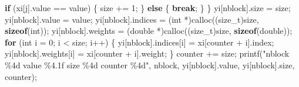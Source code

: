 \documentclass[
  12pt,
  letterpaper,
  DIV=11,
  numbers=noendperiod]{scrreprt}
\newenvironment{Shaded}{\begin{snugshade}}{\end{snugshade}}
\newcommand{\ControlFlowTok}[1]{\textcolor[rgb]{0.00,0.23,0.31}{\textbf{#1}}}
\newcommand{\DataTypeTok}[1]{\textcolor[rgb]{0.68,0.00,0.00}{#1}}
\newcommand{\DecValTok}[1]{\textcolor[rgb]{0.68,0.00,0.00}{#1}}
\newcommand{\KeywordTok}[1]{\textcolor[rgb]{0.00,0.23,0.31}{\textbf{#1}}}
\newcommand{\NormalTok}[1]{\textcolor[rgb]{0.00,0.23,0.31}{#1}}
\newcommand{\OperatorTok}[1]{\textcolor[rgb]{0.37,0.37,0.37}{#1}}
\newcommand{\SpecialCharTok}[1]{\textcolor[rgb]{0.37,0.37,0.37}{#1}}
\newcommand{\StringTok}[1]{\textcolor[rgb]{0.13,0.47,0.30}{#1}}
\theoremstyle{remark}
\begin{document}
\begin{Shaded}
\begin{Highlighting}[]
            \ControlFlowTok{if} \OperatorTok{(}\NormalTok{xi}\OperatorTok{[}\NormalTok{j}\OperatorTok{].}\NormalTok{value }\OperatorTok{==}\NormalTok{ value}\OperatorTok{)} \OperatorTok{\{}
\NormalTok{                size }\OperatorTok{+=} \DecValTok{1}\OperatorTok{;}
            \OperatorTok{\}} \ControlFlowTok{else} \OperatorTok{\{}
                \ControlFlowTok{break}\OperatorTok{;}
            \OperatorTok{\}}
        \OperatorTok{\}}
\NormalTok{        yi}\OperatorTok{[}\NormalTok{nblock}\OperatorTok{].}\NormalTok{size }\OperatorTok{=}\NormalTok{ size}\OperatorTok{;}
\NormalTok{        yi}\OperatorTok{[}\NormalTok{nblock}\OperatorTok{].}\NormalTok{value }\OperatorTok{=}\NormalTok{ value}\OperatorTok{;}
\NormalTok{        yi}\OperatorTok{[}\NormalTok{nblock}\OperatorTok{].}\NormalTok{indices }\OperatorTok{=} \OperatorTok{(}\DataTypeTok{int} \OperatorTok{*)}\NormalTok{calloc}\OperatorTok{((}\DataTypeTok{size\_t}\OperatorTok{)}\NormalTok{size}\OperatorTok{,} \KeywordTok{sizeof}\OperatorTok{(}\DataTypeTok{int}\OperatorTok{));}
\NormalTok{        yi}\OperatorTok{[}\NormalTok{nblock}\OperatorTok{].}\NormalTok{weights }\OperatorTok{=} \OperatorTok{(}\DataTypeTok{double} \OperatorTok{*)}\NormalTok{calloc}\OperatorTok{((}\DataTypeTok{size\_t}\OperatorTok{)}\NormalTok{size}\OperatorTok{,} \KeywordTok{sizeof}\OperatorTok{(}\DataTypeTok{double}\OperatorTok{));}
        \ControlFlowTok{for} \OperatorTok{(}\DataTypeTok{int}\NormalTok{ i }\OperatorTok{=} \DecValTok{0}\OperatorTok{;}\NormalTok{ i }\OperatorTok{\textless{}}\NormalTok{ size}\OperatorTok{;}\NormalTok{ i}\OperatorTok{++)} \OperatorTok{\{}
\NormalTok{            yi}\OperatorTok{[}\NormalTok{nblock}\OperatorTok{].}\NormalTok{indices}\OperatorTok{[}\NormalTok{i}\OperatorTok{]} \OperatorTok{=}\NormalTok{ xi}\OperatorTok{[}\NormalTok{counter }\OperatorTok{+}\NormalTok{ i}\OperatorTok{].}\NormalTok{index}\OperatorTok{;}
\NormalTok{            yi}\OperatorTok{[}\NormalTok{nblock}\OperatorTok{].}\NormalTok{weights}\OperatorTok{[}\NormalTok{i}\OperatorTok{]} \OperatorTok{=}\NormalTok{ xi}\OperatorTok{[}\NormalTok{counter }\OperatorTok{+}\NormalTok{ i}\OperatorTok{].}\NormalTok{weight}\OperatorTok{;}
        \OperatorTok{\}}
\NormalTok{        counter }\OperatorTok{+=}\NormalTok{ size}\OperatorTok{;}
\NormalTok{        printf}\OperatorTok{(}\StringTok{"nblock }\SpecialCharTok{\%4d}\StringTok{ value }\SpecialCharTok{\%4.1f}\StringTok{ size }\SpecialCharTok{\%4d}\StringTok{ counter }\SpecialCharTok{\%4d}\StringTok{"}\OperatorTok{,}\NormalTok{ nblock}\OperatorTok{,}
\NormalTok{               yi}\OperatorTok{[}\NormalTok{nblock}\OperatorTok{].}\NormalTok{value}\OperatorTok{,}\NormalTok{ yi}\OperatorTok{[}\NormalTok{nblock}\OperatorTok{].}\NormalTok{size}\OperatorTok{,}\NormalTok{ counter}\OperatorTok{);}

\end{Highlighting}
\end{Shaded}
\end{document}
